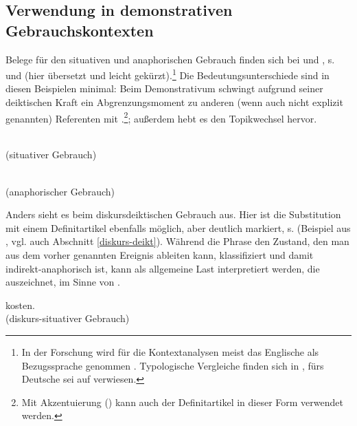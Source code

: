 \subsection{Verwendung in demonstrativen Gebrauchskontexten}\label{sec:definitartikel-in-demonstrativ}

Belege für den situativen und anaphorischen Gebrauch finden sich bei \textcite[110f.]{Hawkins1978} und \textcite[36]{Himmelmann1997}, s.  und  (hier übersetzt und leicht gekürzt).\footnote{In der Forschung wird für die Kontextanalysen meist das Englische als Bezugssprache genommen \parencite{Christophersen1939, Lobner1985,Lyons1999}. Typologische Vergleiche finden sich in \textcite{Himmelmann1997}, fürs Deutsche sei auf \textcite{Bisle-Muller1991} verwiesen.} Die Bedeutungsunterschiede sind in diesen Beispielen minimal: Beim Demonstrativum schwingt aufgrund seiner deiktischen Kraft ein Abgrenzungsmoment zu anderen (wenn auch nicht explizit genannten) Referenten mit \parencite{Bisle-Muller1991}.\footnote{Mit Akzentuierung () kann auch der Definitartikel in dieser Form verwendet werden.}; außerdem hebt es den Topikwechsel hervor.  

\begin{exe}
	\ex \label{ex:sitdef}   \\(situativer Gebrauch)
\end{exe}

\begin{exe}
	\ex \label{ex:anadef}  \\(anaphorischer Gebrauch)
\end{exe}

Anders sieht es beim diskursdeiktischen Gebrauch aus. Hier ist die Substitution mit einem Definitartikel ebenfalls möglich, aber deutlich markiert, s.  (Beispiel aus \cite[95]{Marx2011}, vgl. auch Abschnitt \ref{diskurs-deikt}). Während die Phrase  den Zustand, den man aus dem vorher genannten Ereignis ableiten kann, klassifiziert und damit indirekt-anaphorisch ist, kann  als allgemeine Last interpretiert werden, die  auszeichnet, im Sinne von .

\begin{exe}
	\ex \label{ex:diskurs-deikt-def}   kosten. \\(diskurs-situativer Gebrauch)
	 \end{exe}

